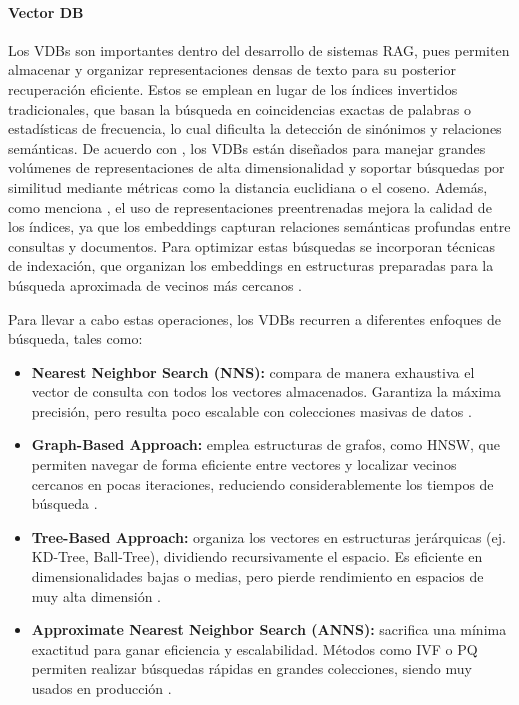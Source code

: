 \paragraph{Vector DB} 
Los VDBs son importantes dentro del desarrollo de sistemas RAG, pues permiten almacenar y organizar representaciones densas de texto para su posterior
recuperación eficiente. Estos se emplean en lugar de los índices invertidos tradicionales, que basan la búsqueda en coincidencias exactas de palabras o estadísticas 
de frecuencia, lo cual dificulta la detección de sinónimos y relaciones semánticas. De acuerdo con \textcite{jing2024vecdb}, los VDBs están diseñados para manejar 
grandes volúmenes de representaciones de alta dimensionalidad y soportar búsquedas por similitud mediante métricas como la distancia euclidiana o el coseno. Además, 
como menciona \textcite{fan2021pretraining}, el uso de representaciones preentrenadas mejora la calidad de los índices, ya que los embeddings capturan relaciones 
semánticas profundas entre consultas y documentos. Para optimizar estas búsquedas se incorporan técnicas de indexación, que organizan los embeddings en estructuras preparadas para la búsqueda aproximada de vecinos más cercanos \parencite{ma2025vector}.  

Para llevar a cabo estas operaciones, los VDBs recurren a diferentes enfoques de búsqueda, tales como:

\begin{itemize}
    \item \textbf{Nearest Neighbor Search (NNS):} compara de manera exhaustiva el vector de consulta con todos los vectores almacenados. Garantiza la máxima precisión,
    pero resulta poco escalable con colecciones masivas de datos \parencite{ma2025vector}.
    
    \item \textbf{Graph-Based Approach:} emplea estructuras de grafos, como HNSW, que permiten navegar de forma eficiente entre vectores y localizar vecinos cercanos 
    en pocas iteraciones, reduciendo considerablemente los tiempos de búsqueda \parencite{jing2024vecdb}.
    
    \item \textbf{Tree-Based Approach:} organiza los vectores en estructuras jerárquicas (ej. KD-Tree, Ball-Tree), dividiendo recursivamente el espacio. Es eficiente 
    en dimensionalidades bajas o medias, pero pierde rendimiento en espacios de muy alta dimensión \parencite{fan2021pretraining}.
    
    \item \textbf{Approximate Nearest Neighbor Search (ANNS):} sacrifica una mínima exactitud para ganar eficiencia y escalabilidad. Métodos como IVF o PQ permiten 
    realizar búsquedas rápidas en grandes colecciones, siendo muy usados en producción \parencite{ma2025vector}.
\end{itemize}

